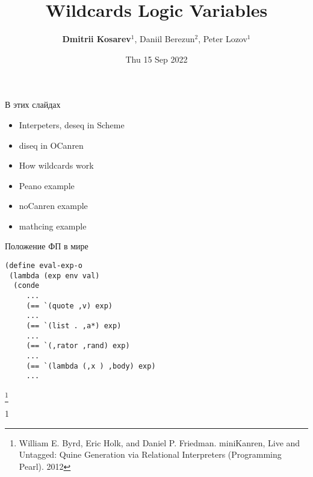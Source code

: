 \documentclass[aspectratio=169
  , xcolor={svgnames}
  , hyperref=
      { colorlinks
      , urlcolor=DarkBlue
      }
  , russian  %
  ]{beamer}
\title{Wildcards Logic Variables}
\date{  Thu 15 Sep 2022}
\author{\textbf{Dmitrii Kosarev}$^1$, Daniil Berezun$^2$, Peter Lozov$^1$}
\institute{St. Petersbur State University, Russia$^1$ \and JetBrains Research, The Netherlands$^2$}
\begin{document}
\maketitle


\everymath{\displaystyle}

\begin{frame}{В этих слайдах}


\begin{itemize}
  \item Interpeters, deseq in Scheme
  \item diseq in OCanren
  \item How wildcards work
  \item Peano example
  \item noCanren example
  \item mathcing example

\end{itemize}


\end{frame}

\begin{frame}[fragile]{Положение ФП в мире}

\begin{verbatim}
(define eval-exp-o
 (lambda (exp env val)
  (conde
     ...
     (== `(quote ,v) exp)
     ...
     (== `(list . ,a*) exp)
     ...
     (== `(,rator ,rand) exp)
     ...
     (== `(lambda (,x ) ,body) exp)
     ...
\end{verbatim}


\footnote{William E. Byrd, Eric Holk, and Daniel P. Friedman.
  miniKanren, Live and Untagged: Quine Generation via Relational Interpreters (Programming Pearl). 2012}
\end{frame}



\begin{frame}[fragile]{23}

1


\end{frame}
\end{document}
